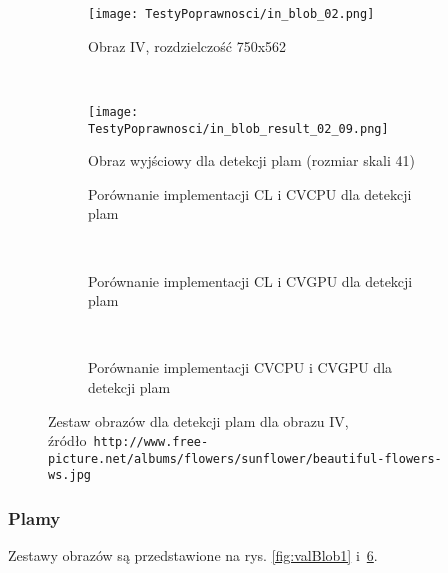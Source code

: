 \begin{figure}[h]
\begin{center}
\begin{subfigure}[t]{0.3\textwidth}
\texttt{[image: TestyPoprawnosci/in\_blob\_02.png]}
\caption{Obraz IV, rozdzielczość 750x562}
\label{fig:valBlob02}
\end{subfigure}
~
\begin{subfigure}[t]{0.3\textwidth}
\texttt{[image: TestyPoprawnosci/in\_blob\_result\_02\_09.png]}
\caption{Obraz wyjściowy dla detekcji plam (rozmiar skali 41)}
\label{fig:valBlobResult02}
\end{subfigure}
\end{center}


\begin{subfigure}[t]{0.3\textwidth}
	\centering
	\setlength\fboxsep{0pt}
	\setlength\fboxrule{0.5pt}
	\caption{Porównanie implementacji CL i CVCPU dla detekcji plam}
	\label{fig:valBlob3CLCVCPU}
\end{subfigure}
~
\begin{subfigure}[t]{0.3\textwidth}
	\centering
	\setlength\fboxsep{0pt}
	\setlength\fboxrule{0.5pt}
	\caption{Porównanie implementacji CL i CVGPU dla detekcji plam}
	\label{fig:valBlob3CLCVGPU}
\end{subfigure}
~
\begin{subfigure}[t]{0.3\textwidth}
	\centering
	\setlength\fboxsep{0pt}
	\setlength\fboxrule{0.5pt}
	\caption{Porównanie implementacji CVCPU i CVGPU dla detekcji plam}
	\label{fig:valBlob3CVCPUCVGPU}                 
\end{subfigure}
\caption{Zestaw obrazów dla detekcji plam dla obrazu IV, \tiny{źródło~\texttt{http://www.free-picture.net/albums/flowers/sunflower/beautiful-flowers-ws.jpg}}}

\label{fig:valBlob2}
\end{figure}

\subsubsection{Plamy}
\label{subsubsec:plamyRysunki}

Zestawy obrazów są przedstawione na rys. \ref{fig:valBlob1} i~\ref{fig:valBlob2}. 

